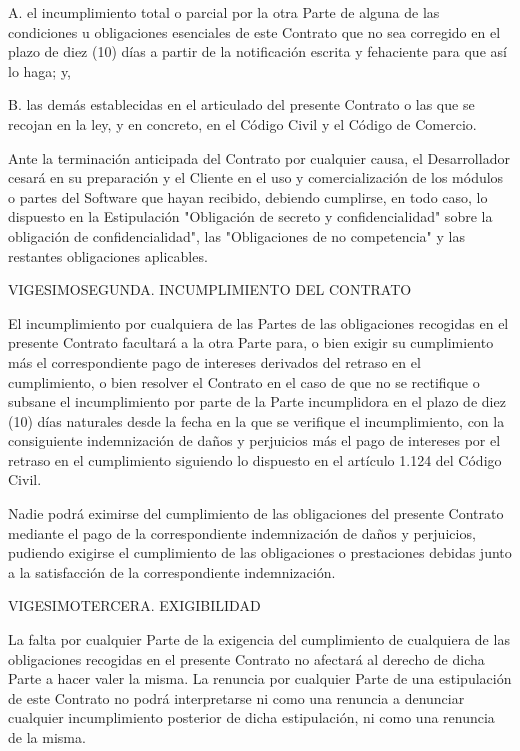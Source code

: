 \documentclass[a4paper,11pt]{report}
\begin{document}
	A. el incumplimiento total o parcial por la otra Parte de alguna de las
	condiciones u obligaciones esenciales de este Contrato que no sea
	corregido en el plazo de diez (10) días a partir de la notificación
	escrita y fehaciente para que así lo haga; y,
	
	B. las demás establecidas en el articulado del presente Contrato o las
	que se recojan en la ley, y en concreto, en el Código Civil y el Código
	de Comercio.
	
	Ante la terminación anticipada del Contrato por cualquier causa, el
	Desarrollador cesará en su preparación y el Cliente en el uso y
	comercialización de los módulos o partes del Software que hayan
	recibido, debiendo cumplirse, en todo caso, lo dispuesto en la
	Estipulación "Obligación de secreto y confidencialidad" sobre la
	obligación de confidencialidad", las "Obligaciones de no competencia" y
	las restantes obligaciones aplicables.
	
	VIGESIMOSEGUNDA. INCUMPLIMIENTO DEL CONTRATO
	
	El incumplimiento por cualquiera de las Partes de las obligaciones
	recogidas en el presente Contrato facultará a la otra Parte para, o bien
	exigir su cumplimiento más el correspondiente pago de intereses
	derivados del retraso en el cumplimiento, o bien resolver el Contrato en
	el caso de que no se rectifique o subsane el incumplimiento por parte de
	la Parte incumplidora en el plazo de diez (10) días naturales desde la
	fecha en la que se verifique el incumplimiento, con la consiguiente
	indemnización de daños y perjuicios más el pago de intereses por el
	retraso en el cumplimiento siguiendo lo dispuesto en el artículo 1.124
	del Código Civil.
	
	Nadie podrá eximirse del cumplimiento de las obligaciones del presente
	Contrato mediante el pago de la correspondiente indemnización de daños y
	perjuicios, pudiendo exigirse el cumplimiento de las obligaciones o
	prestaciones debidas junto a la satisfacción de la correspondiente
	indemnización.
	
	VIGESIMOTERCERA. EXIGIBILIDAD
	
	La falta por cualquier Parte de la exigencia del cumplimiento de
	cualquiera de las obligaciones recogidas en el presente Contrato no
	afectará al derecho de dicha Parte a hacer valer la misma. La renuncia
	por cualquier Parte de una estipulación de este Contrato no podrá
	interpretarse ni como una renuncia a denunciar cualquier incumplimiento
	posterior de dicha estipulación, ni como una renuncia de la misma.
	
\end{document}
